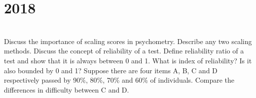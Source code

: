 \section*{2018}
\vspace{-.5cm}
\hrulefill \smallskip\\
 Discuss the importance of scaling scores in psychometry. Describe any two scaling methods.
\myline
{} Discuss the concept of reliability of a test. Define reliability ratio of a test and show that it is always between 0 and 1. What is index of reliability? Is it also bounded by 0 and 1?
\myline
{} Suppose there are four items A, B, C and D respectively passed by 90\%, 80\%, 70\% and 60\% of individuals. Compare the differences in difficulty between C and D.